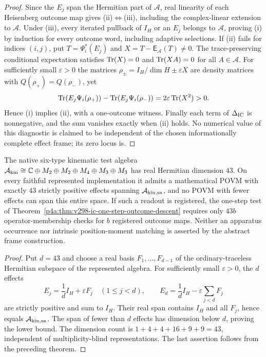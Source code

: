 \documentclass[12pt,a4paper]{article}
\begin{document}
\begin{proof}
Since the $E_j$ span the Hermitian part of $\mathcal A$, real linearity of
each Heisenberg outcome map gives (ii)$\Leftrightarrow$(iii), including the
complex-linear extension to $\mathcal A$. Under (iii), every iterated
pullback of $I_H$ or an $E_j$ belongs to $\mathcal A$, proving (i) by
induction for every outcome word, including adaptive selections.
If (ii) fails for indices $(i,j)$, put
$T=\Psi_i^*(E_j)$ and $X=T-\mathsf E_{\mathcal A}(T)\ne0$.
The trace-preserving conditional expectation satisfies
$\operatorname{Tr}(X)=0$ and $\operatorname{Tr}(XA)=0$ for all $A\in\mathcal A$.
For sufficiently small $\varepsilon>0$ the matrices
$\rho_{\pm}=I_H/\dim H\pm\varepsilon X$ are density matrices with
$Q(\rho_+)=Q(\rho_-)$, yet
\[
\operatorname{Tr}(E_j\Psi_i(\rho_+))-\operatorname{Tr}(E_j\Psi_i(\rho_-))
 =2\varepsilon\operatorname{Tr}(X^2)>0.
\]
Hence (i) implies (ii), with a one-outcome witness. Finally each term of
$\Delta_{\rm IC}$ is nonnegative, and the sum vanishes exactly when (ii)
holds. No numerical value of this diagnostic is claimed to be independent
of the chosen informationally complete effect frame; its zero locus is.
\end{proof}

\begin{corollary}
\label{p4a:cor:v298-kinematic-43-effect-frame}
The native six-type kinematic test algebra
$\mathcal A_{\rm kin}\cong\mathbb C\oplus M_2\oplus M_2\oplus M_4\oplus
M_3\oplus M_3$ has real Hermitian dimension $43$. On every faithful
represented implementation it admits a mathematical POVM with exactly
$43$ strictly positive effects spanning $\mathcal A_{{\rm kin},\rm sa}$,
and no POVM with fewer effects can span this entire space.
If such a readout is registered, the one-step test of
Theorem~\ref{p4a:thm:v298-ic-one-step-outcome-descent} requires only
$43b$ operator-membership checks for $b$ registered outcome maps.
Neither an apparatus occurrence nor intrinsic position-moment matching
is asserted by the abstract frame construction.
\end{corollary}
\begin{proof}
Put $d=43$ and choose a real basis $F_1,\ldots,F_{d-1}$ of the
ordinary-traceless Hermitian subspace of the represented algebra.
For sufficiently small $\varepsilon>0$, the $d$ effects
\[
E_j=\frac1dI_H+\varepsilon F_j\quad(1\le j<d),\qquad
E_d=\frac1dI_H-\varepsilon\sum_{j<d}F_j
\]
are strictly positive and sum to $I_H$. Their real span contains $I_H$
and all $F_j$, hence equals $\mathcal A_{{\rm kin},\rm sa}$.
The span of fewer than $d$ effects has dimension below $d$, proving the
lower bound. The dimension count is $1+4+4+16+9+9=43$, independent of
multiplicity-blind representations. The last assertion follows from the
preceding theorem.
\end{proof}
\end{document}
